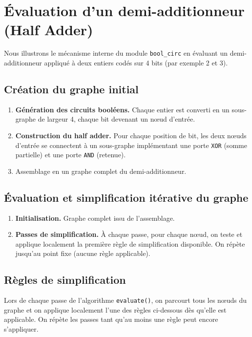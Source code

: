 \documentclass[a4paper,12pt]{article}
\begin{document}




\section{Évaluation d'un demi-additionneur (Half Adder)}\label{sec:halfadder}
Nous illustrons le mécanisme interne du module \texttt{bool\_circ} en évaluant un demi-additionneur appliqué à deux entiers codés sur 4 bits (par exemple 2 et 3).

\subsection{Création du graphe initial}
\begin{enumerate}[label=\arabic*.,nosep]
  \item \textbf{Génération des circuits booléens.} Chaque entier est converti en un sous-graphe de largeur 4, chaque bit devenant un nœud d'entrée.
  \item \textbf{Construction du half adder.} Pour chaque position de bit, les deux nœuds d'entrée se connectent à un sous-graphe implémentant une porte \texttt{XOR} (somme partielle) et une porte \texttt{AND} (retenue).
  \item Assemblage en un graphe complet du demi-additionneur.
\end{enumerate}

\subsection{Évaluation et simplification itérative du graphe}
\begin{enumerate}[label=\arabic*.,nosep]
  \item \textbf{Initialisation.} Graphe complet issu de l'assemblage.
  \item \textbf{Passes de simplification.} À chaque passe, pour chaque nœud, on teste et applique localement la première règle de simplification disponible. On répète jusqu'au point fixe (aucune règle applicable).
\end{enumerate}

\subsection{Règles de simplification}

Lors de chaque passe de l’algorithme \texttt{evaluate()}, on parcourt tous les nœuds du graphe et on applique localement l’une des règles ci-dessous dès qu’elle est applicable. On répète les passes tant qu’au moins une règle peut encore s’appliquer.
\end{document}
